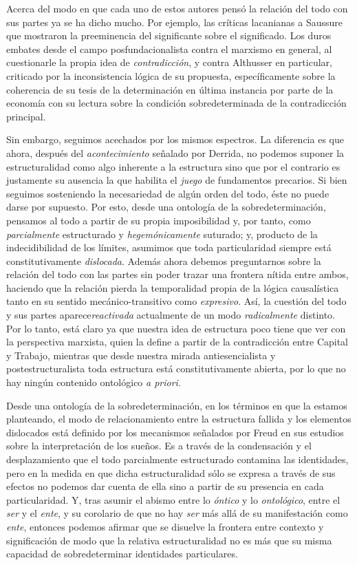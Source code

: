 Acerca del modo en que cada uno de estos autores pensó la relación del todo con sus partes ya se ha dicho mucho. Por ejemplo, las críticas lacanianas a Saussure que mostraron la preeminencia del significante sobre el significado. Los duros embates desde el campo posfundacionalista contra el marxismo en general, al cuestionarle la propia idea de \emph{contradicción}, y contra Althusser en particular, criticado por la inconsistencia lógica de su propuesta, específicamente sobre la coherencia de su tesis de la determinación en última instancia por parte de la economía con su lectura sobre la condición sobredeterminada de la contradicción principal.

Sin embargo, seguimos acechados por los mismos espectros. La diferencia es que ahora, después del \emph{acontecimiento} señalado por Derrida, no podemos suponer la estructuralidad como algo inherente a la estructura sino que por el contrario es justamente su ausencia la que habilita el \emph{juego} de fundamentos precarios. Si bien seguimos sosteniendo la necesariedad de algún orden del todo, éste no puede darse por supuesto. Por esto, desde una ontología de la sobredeterminación, pensamos al todo a partir de su propia imposibilidad y, por tanto, como \emph{parcialmente} estructurado y \emph{hegemónicamente} suturado; y, producto de la indecidibilidad de los límites, asumimos que toda particularidad siempre está constitutivamente \emph{dislocada}. Además ahora debemos preguntarnos sobre la relación del todo con las partes sin poder trazar una frontera nítida entre ambos, haciendo que la relación pierda la temporalidad propia de la lógica causalística tanto en su sentido mecánico-transitivo como \emph{expresivo}. Así, la cuestión del todo y sus partes aparece\emph{reactivada} actualmente de un modo \emph{radicalmente} distinto. Por lo tanto, está claro ya que nuestra idea de estructura poco tiene que ver con la perspectiva marxista, quien la define a partir de la contradicción entre Capital y Trabajo, mientras que desde nuestra mirada antiesencialista y postestructuralista toda estructura está constitutivamente abierta, por lo que no hay ningún contenido ontológico \emph{a priori}.

Desde una ontología de la sobredeterminación, en los términos en que la estamos planteando, el modo de relacionamiento entre la estructura fallida y los elementos dislocados está definido por los mecanismos señalados por Freud en sus estudios sobre la interpretación de los sueños. Es a través de la condensación y el desplazamiento que el todo parcialmente estructurado contamina las identidades, pero en la medida en que dicha estructuralidad sólo se expresa a través de sus efectos no podemos dar cuenta de ella sino a partir de su presencia en cada particularidad. Y, tras asumir el abismo entre lo \emph{óntico} y lo \emph{ontológico}, entre el \emph{ser} y el \emph{ente}, y su corolario de que no hay \emph{ser} más allá de su manifestación como \emph{ente}, entonces podemos afirmar que se disuelve la frontera entre contexto y significación de modo que la relativa estructuralidad no es más que su misma capacidad de sobredeterminar identidades particulares.

